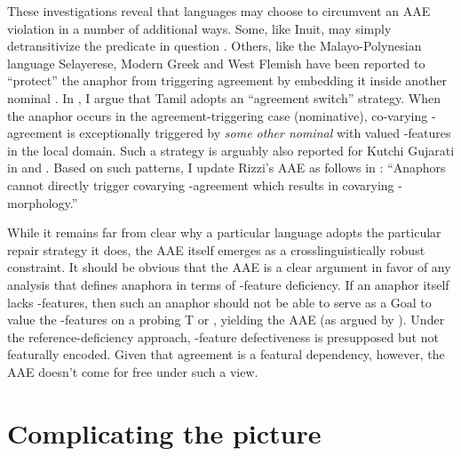 \documentclass[output=paper, modfonts, nonflat]{langsci/langscibook}
\begin{document}
These investigations reveal that languages may choose to circumvent an
AAE violation in a number of additional ways. Some, like Inuit, may
simply detransitivize the predicate in question \citep{woolford:1999,
  bokbennema:1991}. Others, like the Malayo-Polynesian language
Selayerese, Modern Greek and West Flemish have been reported to
``protect'' the anaphor from triggering agreement by embedding it
inside another nominal \citep{woolford:1999, haegeman:2004}. In
\citet{sundaresan:2016a}, I argue that Tamil adopts an ``agreement
switch'' strategy. When the anaphor occurs in the agreement-triggering
case (nominative), co-varying \ph-agreement is exceptionally triggered
by \emph{some other nominal} with valued \ph-features in the local
domain. Such a strategy is arguably also reported for Kutchi Gujarati
in \citet{patelgrosz:2014} and \citet{murugrayn:2017}. Based on
such patterns, I update Rizzi's AAE as follows in
\citet[23]{sundaresan:2016a}: ``Anaphors cannot directly trigger
covarying \ph-agreement which results in covarying \ph-morphology.''

While it remains far from clear why a particular language adopts the
particular repair strategy it does, the AAE itself emerges as a
crosslinguistically robust constraint. It should be obvious that the
AAE is a clear argument in favor of any analysis that defines anaphora
in terms of \ph-feature deficiency. If an anaphor itself lacks
\ph-features, then such an anaphor should not be able to serve as a
Goal to value the \ph-features on a probing T or \lilv, yielding the
AAE (as argued by \citealt{kratzer:2009}). Under the
reference-deficiency approach, \ph-feature defectiveness is
presupposed but not featurally encoded. Given that agreement is a
featural dependency, however, the AAE doesn't come for free under such
a view.

\section{Complicating the picture}
\label{secref}
\end{document}
